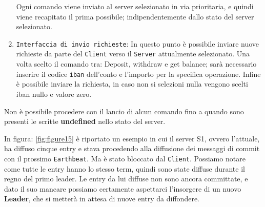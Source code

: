 \begin{enumerate}
\begin{itemize}
		\end{itemize}
		Ogni comando viene inviato al server selezionato in via prioritaria, e quindi viene recapitato il prima possibile; indipendentemente dallo stato del server selezionato. 
	\item \texttt{Interfaccia di invio richieste}:
		In questo punto è possibile inviare nuove richieste da parte del \texttt{Client} verso il \texttt{Server} attualmente selezionato.
		Una volta scelto il comando tra: Deposit, withdraw e get balance; sarà necessario inserire il codice \texttt{iban} dell'conto e l'importo per la specifica operazione.
		Infine è possibile inviare la richiesta, in caso non si selezioni nulla vengono scelti iban nullo e valore zero.	
\end{enumerate}
Non è possibile procedere con il lancio di alcun comando fino a quando sono presenti le scritte \textbf{undefined} nello stato del server.

In figura: \ref{fig:figure15} è riportato un esempio in cui il server S1, ovvero l'attuale, ha diffuso cinque entry e stava procedendo alla diffusione dei messaggi di commit con il prossimo \texttt{Earthbeat}. Ma è stato bloccato dal \texttt{Client}.
Possiamo notare come tutte le entry hanno lo stesso term, quindi sono state diffuse durante il regno del primo leader.
Le entry da lui diffuse non sono ancora committate, e dato il suo mancare possiamo certamente aspettarci l'insorgere di un nuovo \textbf{Leader}, che si metterà in attesa di nuove entry da diffondere.
